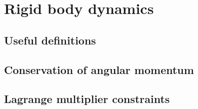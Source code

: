\section{Rigid body dynamics\label{rigidBodyAppendix}}
\subsection{Useful definitions}
\subsection{Conservation of angular momentum\label{correctBrettAppendix}}
\subsection{Lagrange multiplier constraints}
